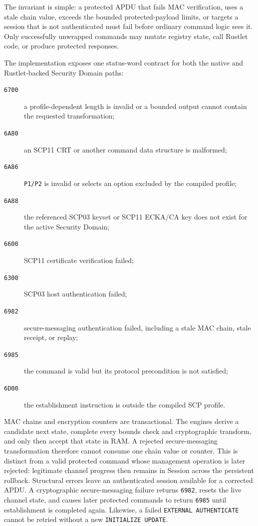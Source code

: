 The invariant is simple: a protected APDU that fails MAC verification, uses a
stale chain value, exceeds the bounded protected-payload limits, or targets a session
that is not authenticated must fail before ordinary command logic sees it.
Only successfully unwrapped commands may mutate registry state, call Rustlet
code, or produce protected responses.

The implementation exposes one status-word contract for both the native and
Rustlet-backed Security Domain paths:
\begin{description}
\item[\texttt{6700}] a profile-dependent length is invalid or a bounded output
      cannot contain the requested transformation;
\item[\texttt{6A80}] an SCP11 CRT or another command data structure is
      malformed;
\item[\texttt{6A86}] \texttt{P1/P2} is invalid or selects an option excluded
      by the compiled profile;
\item[\texttt{6A88}] the referenced SCP03 keyset or SCP11 ECKA/CA key does not
      exist for the active Security Domain;
\item[\texttt{6600}] SCP11 certificate verification failed;
\item[\texttt{6300}] SCP03 host authentication failed;
\item[\texttt{6982}] secure-messaging authentication failed, including a stale
      MAC chain, stale receipt, or replay;
\item[\texttt{6985}] the command is valid but its protocol precondition is not
      satisfied;
\item[\texttt{6D00}] the establishment instruction is outside the compiled
      SCP profile.
\end{description}

MAC chains and encryption counters are transactional. The engines derive a
candidate next state, complete every bounds check and cryptographic transform,
and only then accept that state in RAM. A rejected secure-messaging
transformation therefore cannot consume one chain value or counter. This is
distinct from a valid protected command whose management operation is later
rejected: legitimate channel progress then remains in Session across the
persistent rollback. Structural errors leave an authenticated
session available for a corrected APDU. A cryptographic secure-messaging
failure returns \texttt{6982}, resets the live channel state, and causes later protected
commands to return \texttt{6985} until establishment is completed again.
Likewise, a failed \texttt{EXTERNAL AUTHENTICATE} cannot be retried without a
new \texttt{INITIALIZE UPDATE}.
